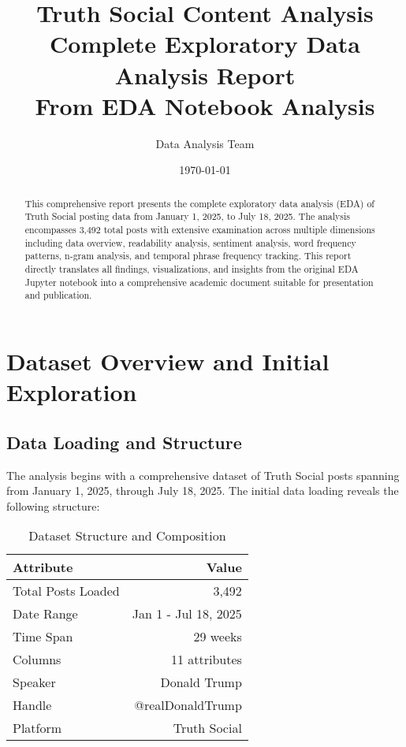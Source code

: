\documentclass[12pt,a4paper]{article}
\title{\textbf{Truth Social Content Analysis}\\
\large Complete Exploratory Data Analysis Report\\
\normalsize From EDA Notebook Analysis}
\author{Data Analysis Team}
\date{\today}
\begin{document}
\maketitle

\begin{abstract}
This comprehensive report presents the complete exploratory data analysis (EDA) of Truth Social posting data from January 1, 2025, to July 18, 2025. The analysis encompasses 3,492 total posts with extensive examination across multiple dimensions including data overview, readability analysis, sentiment analysis, word frequency patterns, n-gram analysis, and temporal phrase frequency tracking. This report directly translates all findings, visualizations, and insights from the original EDA Jupyter notebook into a comprehensive academic document suitable for presentation and publication.
\end{abstract}

\tableofcontents
\newpage

\section{Dataset Overview and Initial Exploration}

\subsection{Data Loading and Structure}

The analysis begins with a comprehensive dataset of Truth Social posts spanning from January 1, 2025, through July 18, 2025. The initial data loading reveals the following structure:

\begin{table}[H]
\centering
\caption{Dataset Structure and Composition}
\begin{tabular}{@{}lr@{}}
\toprule
\textbf{Attribute} & \textbf{Value} \\
\midrule
Total Posts Loaded & 3,492 \\
Date Range & Jan 1 - Jul 18, 2025 \\
Time Span & 29 weeks \\
Columns & 11 attributes \\
Speaker & Donald Trump \\
Handle & @realDonaldTrump \\
Platform & Truth Social \\
\bottomrule
\end{tabular}
\end{table}
\end{document}
